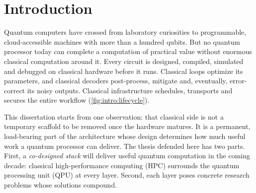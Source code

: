 \chapter{Introduction}\label{ch:intro}


Quantum computers have crossed from laboratory curiosities to programmable, cloud-accessible machines with more than a hundred qubits. But no quantum processor today can complete a computation of practical value without enormous classical computation around it. Every circuit is designed, compiled, simulated and debugged on classical hardware before it runs. Classical loops optimize its parameters, and classical decoders post-process, mitigate and, eventually, error-correct its noisy outputs. Classical infrastructure schedules, transports and secures the entire workflow (\cref{fig:intro:lifecycle}).

This dissertation starts from one observation: that classical side is not a temporary scaffold to be removed once the hardware matures. It is a permanent, load-bearing part of the architecture whose design determines how much useful work a quantum processor can deliver. The thesis defended here has two parts. First, a \emph{co-designed stack} will deliver useful quantum computation in the coming decade: classical high-performance computing (HPC) surrounds the quantum processing unit (QPU) at every layer. Second, each layer poses concrete research problems whose solutions compound.

